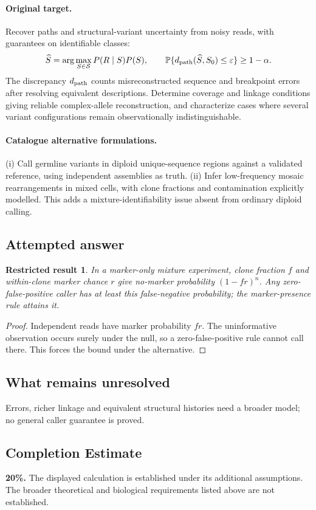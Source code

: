 \documentclass[11pt]{article}
\newcommand{\Prob}{\mathbb P}
\providecommand{\Prob}{\mathbb P}
\newtheorem{attemptresult}{Restricted result}[section]
\begin{document}
\paragraph{Original target.}
Recover paths and structural-variant uncertainty from noisy reads, with guarantees on identifiable classes:
\[\widehat S=\arg\max_{S\in\mathcal S}P(R\mid S)P(S),\qquad \Prob\{d_{\rm path}(\widehat S,S_0)\le\varepsilon\}\ge1-\alpha.\]
The discrepancy $d_{\rm path}$ counts misreconstructed sequence and breakpoint errors after resolving equivalent descriptions. Determine coverage and linkage conditions giving reliable complex-allele reconstruction, and characterize cases where several variant configurations remain observationally indistinguishable.
\paragraph{Catalogue alternative formulations.}
(i) Call germline variants in diploid unique-sequence regions against a validated reference, using independent assemblies as truth. (ii) Infer low-frequency mosaic rearrangements in mixed cells, with clone fractions and contamination explicitly modelled. This adds a mixture-identifiability issue absent from ordinary diploid calling.
\subsection{Attempted answer}
\begin{attemptresult}
In a marker-only mixture experiment, clone fraction $f$ and within-clone marker chance $r$ give no-marker probability $(1-fr)^n$. Any zero-false-positive caller has at least this false-negative probability; the marker-presence rule attains it.
\end{attemptresult}
\begin{proof}
Independent reads have marker probability $fr$. The uninformative observation occurs surely under the null, so a zero-false-positive rule cannot call there. This forces the bound under the alternative.
\end{proof}
\subsection{What remains unresolved}
Errors, richer linkage and equivalent structural histories need a broader model; no general caller guarantee is proved.
\subsection{Completion Estimate}
\textbf{20\%.} The displayed calculation is established under its additional assumptions. The broader theoretical and biological requirements listed above are not established.
\end{document}
